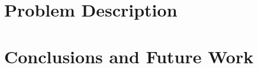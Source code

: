 \documentclass[runningheads,a4paper]{llncs}
\begin{document}

\section{Problem Description}
\label{sec:aibirds}








%
\section{Conclusions and Future Work} 
\label{sec:conclusions}




\end{document}
